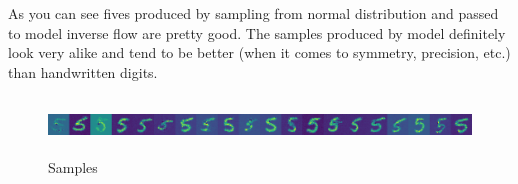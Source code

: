 \documentclass[a4paper]{article}
\begin{document}
As you can see fives produced by sampling from normal distribution and passed to model
inverse flow are pretty good. The samples produced by model definitely look very alike
and tend to be better (when it comes to symmetry, precision, etc.) than handwritten digits.

\begin{figure}[H]
    \centerline{\includegraphics[width=1.1\textwidth, height = 1.5cm]{Samples_05-Jun-2022-20.png}}
    \caption{Samples}
\end{figure}
\end{document}
